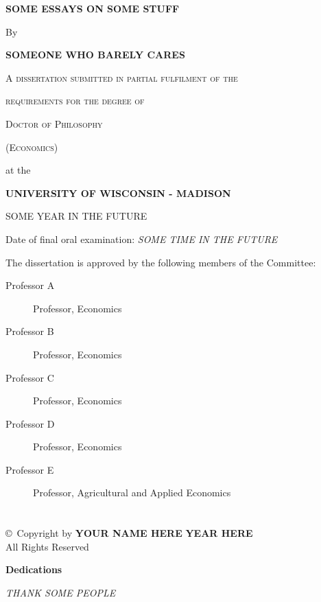 \documentclass[12pt]{article}
\def\copyrightpage{
  \newpage
  \thispagestyle{empty}    %
  \addtocounter{page}{-1}
  \part*{}            %
  \begin{center}
   \vfill
   \copyright\ Copyright by \textbf{YOUR NAME HERE} \textbf{YEAR HERE}\\
   All Rights Reserved
  \end{center}}
\begin{document}
\begin{titlepage}
\begin{center}
\textbf{\Large SOME ESSAYS ON SOME STUFF}

\vspace{0.8cm}
By

\textbf{SOMEONE WHO BARELY CARES}

\vspace{3cm}

\textsc{A dissertation submitted in partial fulfilment of the}

\textsc{requirements for the degree of}

\vspace{2cm}

\textsc{Doctor of Philosophy}

\textsc{(Economics)}

\vspace{1cm}

at the 

\textbf{UNIVERSITY OF WISCONSIN - MADISON}

SOME YEAR IN THE FUTURE

\vspace{2cm}
\begin{flushleft}
Date of final oral examination: \emph{SOME TIME IN THE FUTURE}
\end{flushleft}

\begin{flushleft}
The dissertation is approved by the following members of the Committee:
\end{flushleft}

\begin{description}
\item [Professor A] Professor, Economics
\item [Professor B] Professor, Economics
\item [Professor C] Professor, Economics
\item [Professor D] Professor, Economics
\item [Professor E] Professor, Agricultural and Applied Economics
\end{description}

\end{center}
\end{titlepage}

\copyrightpage


\begin{dedication}
\large{\textbf{Dedications}}

\doublespacing
\emph{THANK SOME PEOPLE}

\end{dedication}
\clearpage
\end{document}
